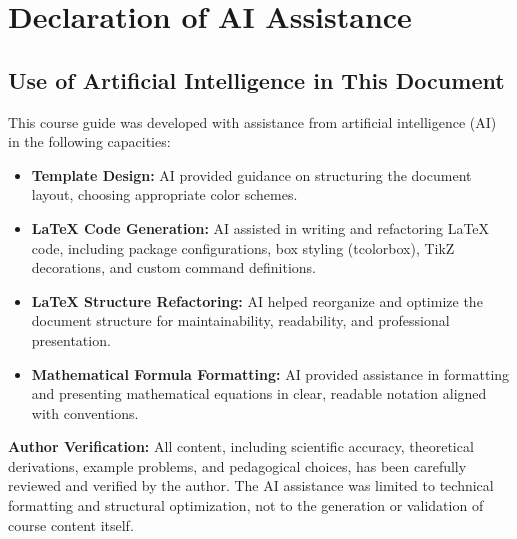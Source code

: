 

\chapter{Declaration of AI Assistance}

\section{Use of Artificial Intelligence in This Document}

This course guide was developed with assistance from artificial intelligence (AI)
in the following capacities:

\begin{itemize}
  \item \textbf{Template Design:} AI provided guidance on structuring the document layout,
        choosing appropriate color schemes.

  \item \textbf{LaTeX Code Generation:} AI assisted in writing and refactoring LaTeX code,
        including package configurations, box styling (tcolorbox), TikZ decorations,
        and custom command definitions.

  \item \textbf{LaTeX Structure Refactoring:} AI helped reorganize and optimize the document
        structure for maintainability, readability, and professional presentation.

  \item \textbf{Mathematical Formula Formatting:} AI provided assistance in formatting and
        presenting mathematical equations in clear, readable notation aligned with
        conventions.
\end{itemize}

\bigskip\noindent
\textbf{Author Verification:} All content, including scientific accuracy, theoretical derivations,
example problems, and pedagogical choices, has been carefully reviewed and verified by the author.
The AI assistance was limited to technical formatting and structural optimization, not to
the generation or validation of course content itself.






\clearpage


